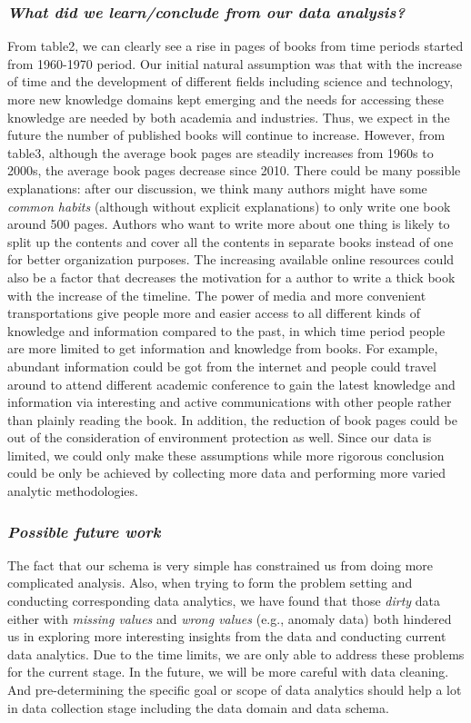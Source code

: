 \documentclass[10pt, oneside]{article}
\begin{document}
\subsubsection*{\textit{What did we learn/conclude from our data analysis?  }}
From table2, we can clearly see a rise in pages of books from time periods started from 1960-1970 period. Our initial natural assumption was that with the increase of time and the development of different fields including science and 
technology, more new knowledge domains kept emerging and the needs for accessing these knowledge are needed by both academia and industries. Thus, we expect in the future the number of published books will continue to increase. However, from table3, although the average book pages are steadily increases from 1960s to 2000s, the average book pages decrease since 2010.  There could be many possible explanations: after our discussion, we think many authors might have some \textit{common habits} (although without explicit explanations) to only write one book around 500 pages. Authors who want to write more about one thing is likely to split up the contents and cover all the contents in separate books instead of one for better organization purposes. The increasing available online resources could also be a factor that decreases the motivation for a author to write a thick book with the increase of the timeline.  The power of media and more convenient transportations give people more and easier access to all different kinds of knowledge and information compared to the past, in which time period people are more limited to get information and knowledge from books. For example, abundant information could be got from the internet and people could travel around to attend different academic conference to gain the latest knowledge and information via interesting and active
communications with other people rather than plainly reading the book. In addition, the reduction of book pages could be out of the consideration of environment protection as well. Since our data is limited, we could only make these assumptions while more rigorous conclusion could be only be achieved by collecting more data and performing more varied analytic methodologies.

\subsubsection*{\textit{Possible future work}}
The fact that our schema is very simple has constrained us from doing more complicated analysis. Also, when trying to form the problem setting and conducting corresponding data analytics, we have found that those 
\textit{dirty} data either with \textit{missing values} and \textit{wrong values} (e.g., anomaly data) both hindered us in exploring more interesting insights from the data and conducting current data analytics. Due to the time limits,
we are only able to address these problems for the current stage. In the future, we will be more careful with data cleaning. And pre-determining the specific goal or scope of data analytics should help a lot in data collection stage
including the data domain and data schema.
\end{document}

